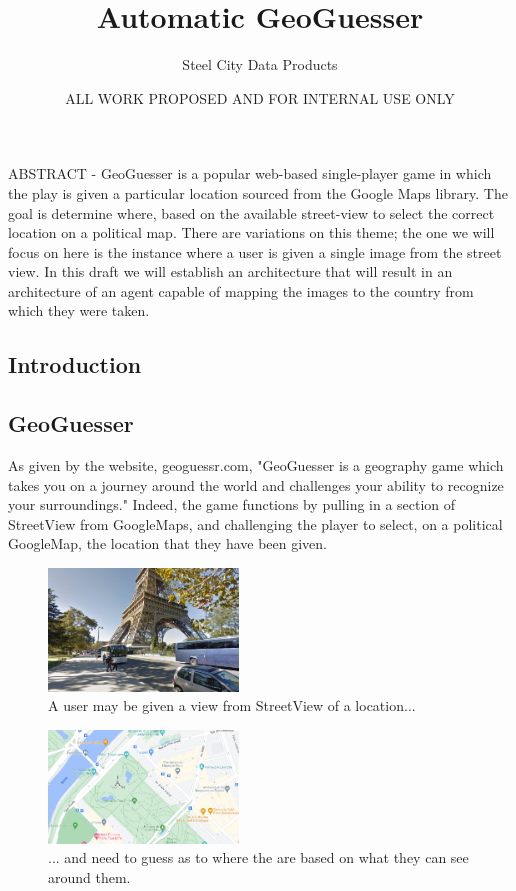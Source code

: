 \documentclass{article}
\title{Automatic GeoGuesser}
\author{Steel City Data Products}
\date{ALL WORK PROPOSED AND FOR INTERNAL USE ONLY}
\begin{document}
	\maketitle
	
	ABSTRACT - GeoGuesser is a popular web-based single-player game in which the play is given a particular location sourced from the Google Maps library. The goal is determine where, based on the available street-view to select the correct location on a political map. There are variations on this theme; the one we will focus on here is the instance where a user is given a single image from the street view. In this draft we will establish an architecture that will result in an architecture of an agent capable of mapping the images to the country from which they were taken. 
	
	\begin{multicols}{2}
	\section{Introduction}
	\subsection{GeoGuesser}
	As given by the website, geoguessr.com, "GeoGuesser is a geography game which takes you on a journey around the world and challenges your ability to recognize your surroundings." Indeed, the game functions by pulling in a section of StreetView from GoogleMaps, and challenging the player to select, on a political GoogleMap, the location that they have been given.
		
		\begin{figure}[H]
			\includegraphics[width = 0.45\textwidth]{eiffeltourpic.png}
			\caption{A user may be given a view from StreetView of a location...}
		\end{figure}
		
		\begin{figure}[H]
			\includegraphics[width = 0.45\textwidth]{eiffeltourmap.png}
			\caption{... and need to guess as to where the are based on what they can see around them.}
		\end{figure}
		

\end{multicols}
\end{document}
